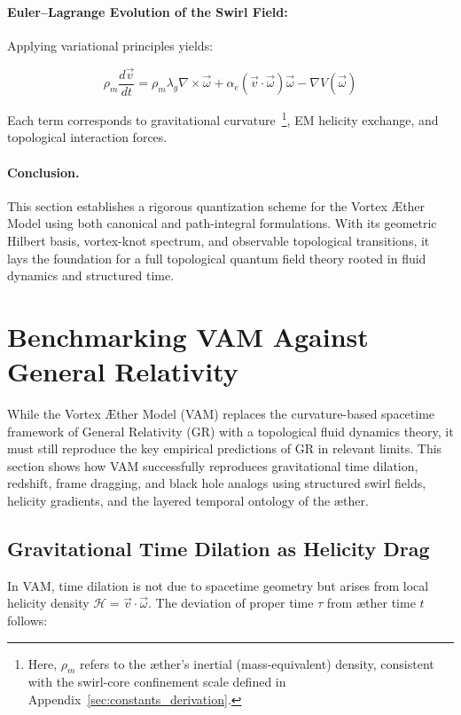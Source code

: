 \documentclass[preprint]{revtex4-2}
\begin{document}
    \paragraph{Euler–Lagrange Evolution of the Swirl Field:}
    Applying variational principles yields:

    \[
    \rho_{\scriptscriptstyle\boldsymbol\!m} \frac{d\vec{v}}{dt} = \rho_{\scriptscriptstyle\boldsymbol\!m} \lambda_g \nabla \times \vec{\omega} + \alpha_e (\vec{v} \cdot \vec{\omega}) \vec{\omega} - \nabla V(\vec{\omega})
        \label{eq:euler_lagrange_swirl}
    \]

    Each term corresponds to gravitational curvature~\footnote{Here, \textbf{\boldmath\( \rho_{\scriptscriptstyle\boldsymbol\!m} \)} refers to the æther’s inertial (mass-equivalent) density, consistent with the swirl-core confinement scale defined in Appendix~\ref{sec:constants_derivation}.
}, EM helicity exchange, and topological interaction forces.

    \paragraph{Conclusion.} This section establishes a rigorous quantization scheme for the Vortex \AE{}ther Model using both canonical and path-integral formulations. With its geometric Hilbert basis, vortex-knot spectrum, and observable topological transitions, it lays the foundation for a full topological quantum field theory rooted in fluid dynamics and structured time.


\section{Benchmarking VAM Against General Relativity}
    While the Vortex \AE{}ther Model (VAM) replaces the curvature-based spacetime framework of General Relativity (GR) with a topological fluid dynamics theory, it must still reproduce the key empirical predictions of GR in relevant limits. This section shows how VAM successfully reproduces gravitational time dilation, redshift, frame dragging, and black hole analogs using structured swirl fields, helicity gradients, and the layered temporal ontology of the æther.

    \subsection{Gravitational Time Dilation as Helicity Drag}
    In VAM, time dilation is not due to spacetime geometry but arises from local helicity density \( \mathcal{H} = \vec{v} \cdot \vec{\omega} \). The deviation of proper time \( \tau \) from æther time \( t \) follows:
\end{document}
